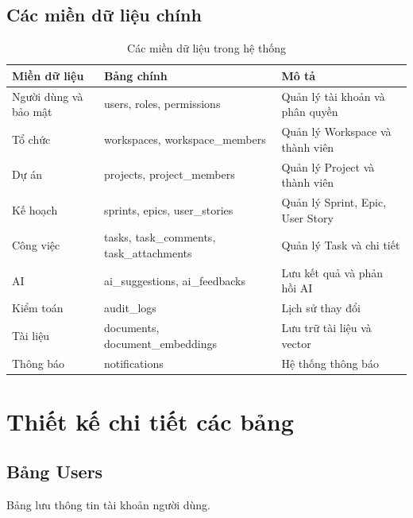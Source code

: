 \documentclass[12pt,a4paper]{report}
\begin{document}
\subsection{Các miền dữ liệu chính}

\begin{table}[H]
\centering
\caption{Các miền dữ liệu trong hệ thống}
\begin{tabular}{|p{4cm}|p{4.5cm}|p{5cm}|}
\hline
\textbf{Miền dữ liệu} & \textbf{Bảng chính} & \textbf{Mô tả} \\
\hline
Người dùng và bảo mật & users, roles, permissions & Quản lý tài khoản và phân quyền \\
\hline
Tổ chức & workspaces, workspace\_members & Quản lý Workspace và thành viên \\
\hline
Dự án & projects, project\_members & Quản lý Project và thành viên \\
\hline
Kế hoạch & sprints, epics, user\_stories & Quản lý Sprint, Epic, User Story \\
\hline
Công việc & tasks, task\_comments, task\_attachments & Quản lý Task và chi tiết \\
\hline
AI & ai\_suggestions, ai\_feedbacks & Lưu kết quả và phản hồi AI \\
\hline
Kiểm toán & audit\_logs & Lịch sử thay đổi \\
\hline
Tài liệu & documents, document\_embeddings & Lưu trữ tài liệu và vector \\
\hline
Thông báo & notifications & Hệ thống thông báo \\
\hline
\end{tabular}
\label{tab:data_domains}
\end{table}

\section{Thiết kế chi tiết các bảng}

\subsection{Bảng Users}

Bảng lưu thông tin tài khoản người dùng.
\end{document}
